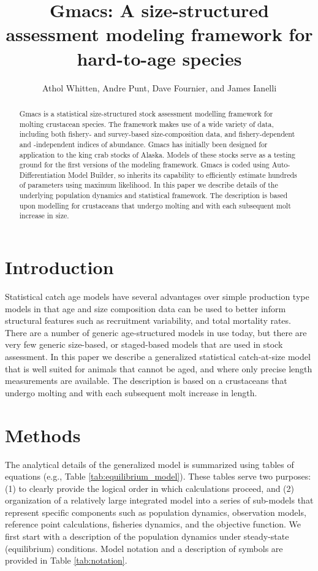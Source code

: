 \documentclass[12pt,letterpaper]{article}
\title{Gmacs: A size-structured assessment modeling framework for hard-to-age species}
\author{Athol Whitten, Andre Punt, Dave Fournier, and James Ianelli}
\begin{document}
  \maketitle

  \begin{abstract}
    Gmacs is a statistical size-structured stock assessment modelling framework for molting crustacean species. The framework makes use of a wide variety of data, including both fishery- and survey-based size-composition data, and fishery-dependent and -independent indices of abundance. Gmacs has initially been designed for application to the king crab stocks of Alaska. Models of these stocks serve as a testing ground for the first versions of the modeling framework. Gmacs is coded using Auto-Differentiation Model Builder, so inherits its capability to efficiently estimate hundreds of parameters using maximum likelihood. In this paper we describe details of the underlying population dynamics and statistical framework. The description is based upon modelling for crustaceans that undergo molting and with each subsequent molt increase in size.

  \end{abstract}


  \section*{Introduction} %
  \label{sec:introduction}

  Statistical catch age models have several advantages over simple production type models in that age and size composition data can be used to better inform structural features such as recruitment variability, and total mortality rates.  There are a number of generic age-structured models in use today, but there are very few generic size-based, or staged-based models that are used in stock assessment. In this paper we describe a generalized statistical catch-at-size model that is well suited for animals that cannot be aged, and where only precise length measurements are available. The description is based on a crustaceans that undergo molting and with each subsequent molt increase in length.


  \section*{Methods} %
  \label{sec:methods}
  The analytical details of the generalized model is summarized using tables of equations (e.g., Table \ref{tab:equilibrium_model}).   These tables serve two purposes: (1) to clearly provide the logical order in which calculations proceed, and (2) organization of a relatively large integrated model into a series of sub-models that represent specific components such as population dynamics, observation models, reference point calculations, fisheries dynamics, and the objective function.  We first start with a description of the population dynamics under steady-state (equilibrium) conditions.  Model notation and a description of symbols are provided in Table \ref{tab:notation}.
\end{document}
